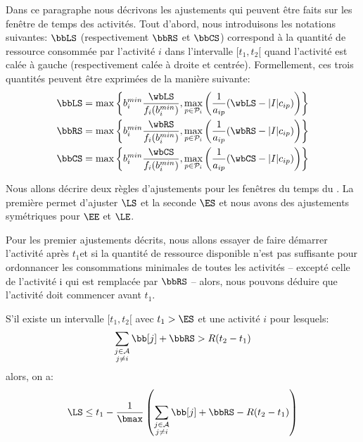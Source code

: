 Dans ce paragraphe nous décrivons les ajustements qui peuvent être
faits sur les fenêtre de temps des activités. Tout d'abord, nous
introduisons les notations suivantes: $\bbLS$ (respectivement $\bbRS$
et $\bbCS$) correspond à la quantité de ressource consommée par
l'activité $i$ dans l'intervalle $[t_1,t_2[$ quand l'activité est
calée à gauche (respectivement calée à droite et
centrée). Formellement, ces trois quantités peuvent être exprimées de
la manière suivante:
\begin{align}
  \bbLS&=   \max \left\{b_i^{min} \frac{\wbLS}{f_i(b_i^{min})},
         \max_{ p \in \P_i} \left(\frac{1}{a_{ip}}(\wbLS-|I|c_{ip})\right)\right\}\\
  \bbRS&=   \max \left\{b_i^{min} \frac{\wbRS}{f_i(b_i^{min})},
         \max_{ p \in \P_i} \left(\frac{1}{a_{ip}}(\wbRS-|I|c_{ip})\right)\right\}\\
  \bbCS&=  \max \left\{b_i^{min} \frac{\wbCS}{f_i(b_i^{min})},
         \max_{ p \in \P_i} \left(\frac{1}{a_{ip}}(\wbCS-|I|c_{ip})\right)\right\}
\end{align}

Nous allons décrire deux règles d'ajustements pour les fenêtres du
temps du \CECSP. La première permet d'ajuster $\LS$ et la seconde
$\ES$ et nous avons des ajustements symétriques pour $\EE$ et $\LE$. 

Pour les premier ajustements décrits, nous allons essayer de faire
démarrer l'activité après $t_1$et si la quantité de ressource
disponible n’est pas suffisante pour ordonnancer les consommations
minimales de toutes les activités – excepté celle de l’activité i qui
est remplacée par $\bbRS$ – alors, nous pouvons déduire que l’activité
doit commencer avant $t_1$.

\begin{reg}
  \label{reg:ajust_CECSP}
  S’il existe un intervalle $[t_1 , t_2 [$ avec $t_1 > \ES$ et une
  activité $i$ pour lesquels:
  \[ \sum_{\substack{j \in \A\\ j\neq i}} \bb[j] + \bbRS > R(t_2-t_1)
  \]
  alors, on a:
  \[ \LS \le t_1 - \frac{1}{\bmax}\left(\sum_{\substack{j \in \A\\ j\neq i}} \bb[j] + \bbRS - R(t_2-t_1)\right)
  \]
\end{reg}

